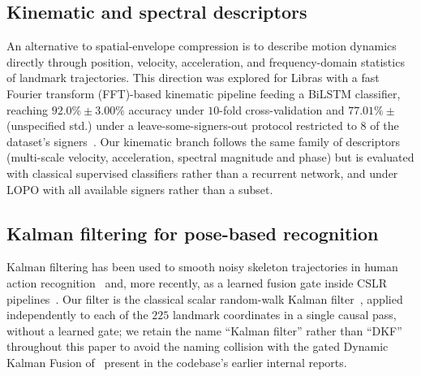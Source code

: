 \documentclass[journal]{IEEEtran}
\begin{document}
\subsection{Kinematic and spectral descriptors}
An alternative to spatial-envelope compression is to describe motion dynamics directly through position, velocity, acceleration, and frequency-domain statistics of landmark trajectories. This direction was explored for Libras with a fast Fourier transform (FFT)-based kinematic pipeline feeding a BiLSTM classifier, reaching $92.0\%\pm3.00\%$ accuracy under $10$-fold cross-validation and $77.01\%\pm$ (unspecified std.) under a leave-some-signers-out protocol restricted to $8$ of the dataset's signers~\cite{rego2025}. Our kinematic branch follows the same family of descriptors (multi-scale velocity, acceleration, spectral magnitude and phase) but is evaluated with classical supervised classifiers rather than a recurrent network, and under LOPO with all available signers rather than a subset.

\subsection{Kalman filtering for pose-based recognition}
Kalman filtering has been used to smooth noisy skeleton trajectories in human action recognition~\cite{wan2023kalman} and, more recently, as a learned fusion gate inside CSLR pipelines~\cite{zhang2024}. Our filter is the classical scalar random-walk Kalman filter~\cite{kalman1960}, applied independently to each of the $225$ landmark coordinates in a single causal pass, without a learned gate; we retain the name ``Kalman filter'' rather than ``DKF'' throughout this paper to avoid the naming collision with the gated Dynamic Kalman Fusion of~\cite{zhang2024} present in the codebase's earlier internal reports.
\end{document}
